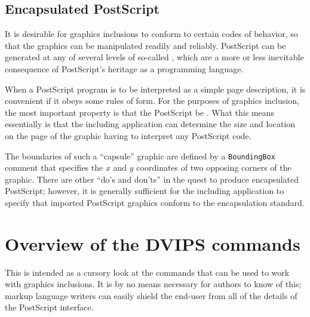 \subsection{Encapsulated PostScript}

It is desirable for graphics inclusions to conform to certain
codes of behavior, so that the graphics can be manipulated
readily and reliably.  PostScript can be generated at any of
several levels of so-called ,
which are a more or less inevitable consequence of PostScript's
heritage as a programming language.

When a PostScript program is to be interpreted as a simple
page description, it is convenient if it obeys some rules of
form.  For the purposes of graphics inclusion, the most
important property is that the PostScript be .
What this means essentially is that the including application
can determine the size and location on the page of the graphic
 having to interpret any PostScript code.

The boundaries of such a ``capsule'' graphic are defined by
a \verb"BoundingBox" comment that specifies the $x$ and $y$
coordinates of two opposing corners of the graphic.
There are other ``do's and don'ts'' in the quest to produce
encapsulated PostScript; however, it is generally sufficient
for the including application to specify that imported
PostScript graphics conform to the encapsulation standard.

\section{Overview of the DVIPS commands}

This is intended as a cursory look at the commands that can
be used to work with graphics inclusions.  It is by no means
necessary for authors to know  of this; markup
language writers can easily shield the end-user from all of
the details of the PostScript interface.

